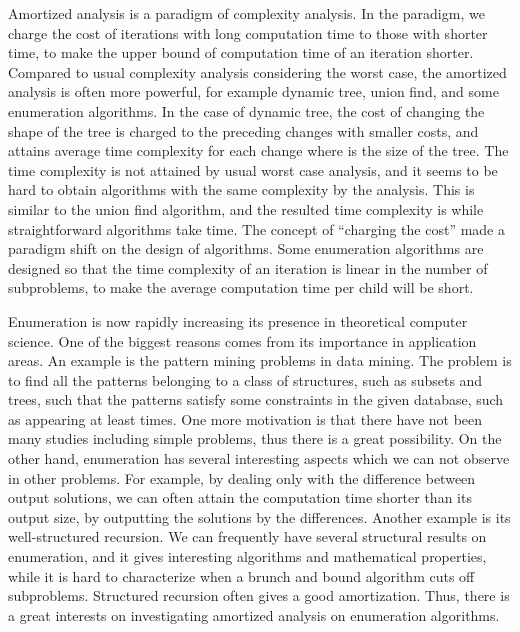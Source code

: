 \documentclass{llncs}
\begin{document}
Amortized analysis is a paradigm of complexity analysis.
In the paradigm, we charge the cost of iterations with long
 computation time to those with shorter time, to make the upper
 bound of computation time of an iteration shorter.
Compared to usual complexity analysis considering the worst case, 
 the amortized analysis is often more powerful, for example dynamic
 tree, union find, and some enumeration algorithms\cite{DynamicTree,UnionFind}.
In the case of dynamic tree, the cost of changing the shape of the tree
 is charged to the preceding changes with smaller costs, and
 attains  average time complexity for each
 change where  is the size of the tree.
The time complexity is not attained by usual worst case analysis, 
 and it seems to be hard to obtain algorithms with the same
 complexity by the analysis.
This is similar to the union find algorithm, and the resulted 
 time complexity is  while straightforward algorithms
 take  time.
The concept of ``charging the cost'' made a paradigm shift on the 
 design of algorithms.
Some enumeration algorithms are designed so that the time complexity
 of an iteration is linear in the number of subproblems, to make the
 average computation time per child will be short\cite{KpRm95,SrTmUn97}.

Enumeration is now rapidly increasing its presence in theoretical 
 computer science.
One of the biggest reasons comes from its importance in application areas.
An example is the pattern mining problems in data mining.
The problem is to find all the patterns belonging to a class of structures,
 such as subsets and trees, such that the patterns satisfy some constraints
 in the given database, such as appearing at least  times.
One more motivation is that there have not been many studies including
 simple problems, thus there is a great possibility.
On the other hand, enumeration has several interesting aspects which we can 
 not observe in other problems.
For example, by dealing only with the difference between output solutions,
 we can often attain the computation time shorter than its output size, by 
 outputting the solutions by the differences.
Another example is its well-structured recursion. 
We can frequently have several structural results on enumeration, and
 it gives interesting algorithms and mathematical properties, while 
 it is hard to characterize when a brunch and bound algorithm cuts off
 subproblems.
Structured recursion often gives a good amortization.
Thus, there is a great interests on investigating amortized analysis 
 on enumeration algorithms.
\end{document}
